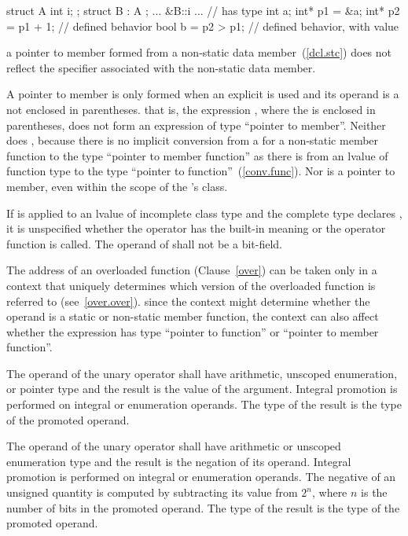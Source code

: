 \begin{codeblock}
struct A { int i; };
struct B : A { };
... &B::i ...       // has type 
int a;
int* p1 = &a;
int* p2 = p1 + 1;   // defined behavior
bool b = p2 > p1;   // defined behavior, with value 
\end{codeblock}
\exitexample 
\enternote 
a pointer to member formed from a  non-static data
member~(\ref{dcl.stc}) does not reflect the  specifier
associated with the non-static data member.
\exitnote 

\pnum
A pointer to member is only formed when an explicit \tcode{\&} is used
and its operand is a  not enclosed in
parentheses.
\enternote 
that is, the expression , where the
 is enclosed in parentheses, does not form an
expression of type ``pointer to member''. Neither does
, because there is no implicit conversion from a
 for a non-static member function to the type
``pointer to member function'' as there is from an lvalue of function
type to the type ``pointer to function''~(\ref{conv.func}). Nor is
 a pointer to member, even within the scope of
the 's class.
\exitnote 

\pnum
If \tcode{\&} is applied to an lvalue of incomplete class type and the
complete type declares , it is unspecified whether
the operator has the built-in meaning or the operator function is
called. The operand of \tcode{\&} shall not be a bit-field.

\pnum
{}%
The address of an overloaded function (Clause~\ref{over}) can be taken
only in a context that uniquely determines which version of the
overloaded function is referred to (see~\ref{over.over}).
\enternote 
since the context might determine whether the operand is a static or
non-static member function, the context can also affect whether the
expression has type ``pointer to function'' or ``pointer to member
function''.
\exitnote 

\pnum
{}%
The operand of the unary \tcode{+} operator shall have arithmetic, unscoped
enumeration, or pointer type and the result is the value of the
argument. Integral promotion is performed on integral or enumeration
operands. The type of the result is the type of the promoted operand.

\pnum
{}%
The operand of the unary \tcode{-} operator shall have arithmetic or unscoped
enumeration type and the result is the negation of its operand. Integral
promotion is performed on integral or enumeration operands. The negative
of an unsigned quantity is computed by subtracting its value from $2^n$,
where $n$ is the number of bits in the promoted operand. The type of the
result is the type of the promoted operand.

